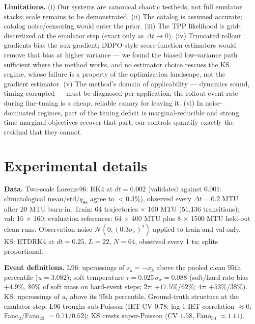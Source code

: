 \documentclass[11pt]{article}
\begin{document}
\textbf{Limitations.} (i) Our systems are canonical chaotic testbeds, not
full emulator stacks; scale remains to be demonstrated. (ii) The catalog
is assumed accurate; catalog noise/censoring would enter the prior.
(iii) The TPP likelihood is grid-discretized at the emulator step
(exact only as $\Delta t \to 0$). (iv) Truncated rollout gradients bias
the aux gradient; DDPO-style score-function estimators
\citep{black2024ddpo} would remove that bias at higher variance --- we
found the biased low-variance path sufficient where the method works, and
no estimator choice rescues the KS regime, whose failure is a property of
the optimization landscape, not the gradient estimator. (v) The method's
domain of applicability --- dynamics sound, timing corrupted --- must be
diagnosed per application; the rollout event rate during fine-tuning is a
cheap, reliable canary for leaving it. (vi) In noise-dominated regimes,
part of the timing deficit is marginal-reducible and strong time-marginal
objectives recover that part; our controls quantify exactly the residual
that they cannot.




\appendix

\section{Experimental details}
\label{app:details}

\textbf{Data.} Two-scale Lorenz-96: RK4 at $dt{=}0.002$ (validated against
$0.001$: climatological mean/std/$q_{98}$ agree to $<0.3\%$), observed
every $\Delta t{=}0.2$ MTU after 20 MTU burn-in. Train: 64 trajectories
$\times$ 160 MTU (51{,}136 transitions); val: 16 $\times$ 160; evaluation
references: 64 $\times$ 400 MTU plus 8 $\times$ 1500 MTU held-out clean
runs. Observation noise $\mathcal{N}(0, (0.3\sigma_x)^2)$ applied to train
and val only. KS: ETDRK4 \citep{kassam2005fourth} at $dt{=}0.25$, $L{=}22$,
$N{=}64$, observed every 1 tu; splits proportional.

\textbf{Event definitions.} L96: upcrossings of $s_k = -x_k$ above the
pooled clean 95th percentile ($u = 3.082$); soft temperature
$\tau = 0.025\,\sigma_x = 0.088$ (soft/hard rate bias $+4.9\%$, $80\%$ of
soft mass on hard-event steps; $2\tau$: $+17.5\%$/$62\%$;
$4\tau$: $+53\%$/$38\%$). KS: upcrossings of $u_i$ above its 95th
percentile. Ground-truth structure at the emulator step: L96 troughs
sub-Poisson (IET CV $0.78$; lag-1 IET correlation $\approx 0$;
Fano$_{2}$/Fano$_{20}$ $=0.71/0.62$); KS crests super-Poisson (CV $1.58$,
Fano$_{50}$ $\approx 1.11$).
\end{document}
